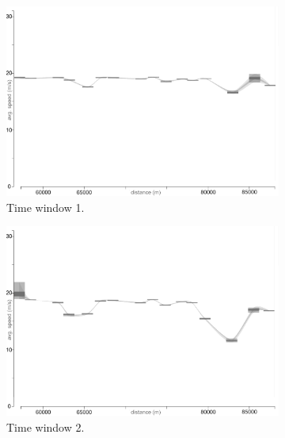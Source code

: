 \begin{figure}[h]
    \centering
    \begin{subfigure}{0.32\textwidth}
        \includegraphics[width=\textwidth]{images/sampling/timestep_a_truth.png}
        \caption{Time window 1.}
        \label{fig:d}
    \end{subfigure}
    \begin{subfigure}{0.32\textwidth}
        \includegraphics[width=\textwidth]{images/sampling/timestep_b_truth.png}
        \caption{Time window 2.}
        \label{fig:e}
    \end{subfigure}
    \begin{subfigure}{0.32\textwidth}

\end{subfigure}
\end{figure}
